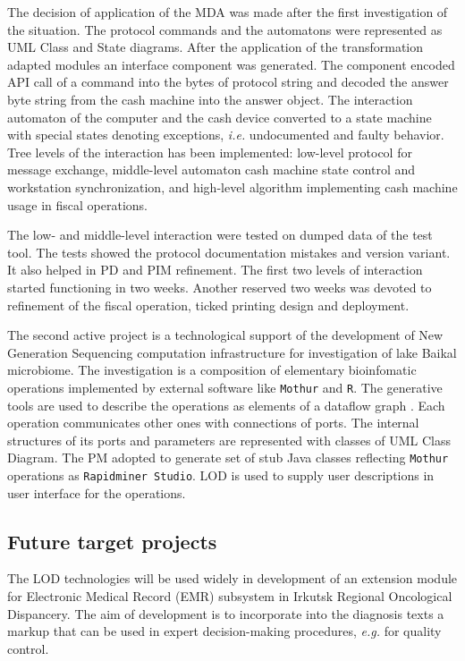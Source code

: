 \documentclass[conference,a4paper]{IEEEtran}
\begin{document}
The decision of application of the MDA was made after the first investigation of the situation.  The protocol commands and the automatons were represented as UML Class and State diagrams.  After the application of the transformation adapted modules an interface component was generated.  The component encoded API call of a command into the bytes of protocol string and decoded the answer byte string from the cash machine into the answer object.  The interaction automaton of the computer and the cash device converted to a state machine with special states denoting exceptions, \emph{i.e.} undocumented and faulty behavior.  Tree levels of the interaction has been implemented: low-level protocol for message exchange, middle-level automaton cash machine state control and workstation synchronization, and high-level algorithm implementing cash machine usage in fiscal operations.

The low- and middle-level interaction were tested on dumped data of the test tool.  The tests showed the protocol documentation mistakes and version variant.  It also helped in PD and PIM refinement.  The first two levels of interaction started functioning in two weeks.  Another reserved two weeks was devoted to refinement of the fiscal operation, ticked printing design and deployment.

The second active project is a technological support of the development of New Generation Sequencing computation infrastructure for investigation of lake Baikal microbiome.  The investigation is a composition of elementary bioinfomatic operations implemented by external software like \texttt{Mothur} and \texttt{R}.  The generative tools are used to describe the operations as elements of a dataflow graph \cite{dataflow}.  Each operation communicates other ones with connections of ports.  The internal structures of its ports and parameters are represented with classes of UML Class Diagram.  The PM adopted to generate set of stub Java classes reflecting \texttt{Mothur} operations as \texttt{Rapidminer Studio}.  LOD is used to supply user descriptions in user interface for the operations.

\subsection{Future target projects}
\label{sec:futuretargets}

The LOD technologies will be used widely in development of an extension module for Electronic Medical Record (EMR) subsystem in Irkutsk Regional Oncological Dispancery.  The aim of development is to incorporate into the diagnosis texts a markup that can be used in expert decision-making procedures, \emph{e.g.} for quality control.
\end{document}
